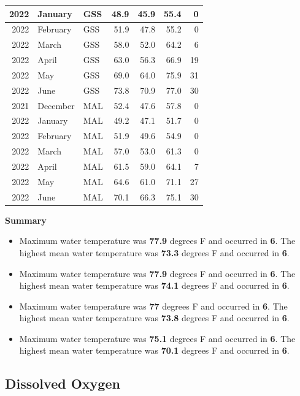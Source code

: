 \documentclass[
]{book}
\providecommand{\tightlist}{%
  \setlength{\itemsep}{0pt}\setlength{\parskip}{0pt}}
\theoremstyle{definition}
\theoremstyle{definition}
\theoremstyle{definition}
\theoremstyle{definition}
\theoremstyle{remark}
\begin{document}
\begin{table}
\begin{tabular}[t]{rllrrrr}
\hline
2022 & January & GSS & 48.9 & 45.9 & 55.4 & 0\\
\hline
2022 & February & GSS & 51.9 & 47.8 & 55.2 & 0\\
\hline
2022 & March & GSS & 58.0 & 52.0 & 64.2 & 6\\
\hline
2022 & April & GSS & 63.0 & 56.3 & 66.9 & 19\\
\hline
2022 & May & GSS & 69.0 & 64.0 & 75.9 & 31\\
\hline
2022 & June & GSS & 73.8 & 70.9 & 77.0 & 30\\
\hline
2021 & December & MAL & 52.4 & 47.6 & 57.8 & 0\\
\hline
2022 & January & MAL & 49.2 & 47.1 & 51.7 & 0\\
\hline
2022 & February & MAL & 51.9 & 49.6 & 54.9 & 0\\
\hline
2022 & March & MAL & 57.0 & 53.0 & 61.3 & 0\\
\hline
2022 & April & MAL & 61.5 & 59.0 & 64.1 & 7\\
\hline
2022 & May & MAL & 64.6 & 61.0 & 71.1 & 27\\
\hline
2022 & June & MAL & 70.1 & 66.3 & 75.1 & 30\\
\hline
\end{tabular}
\end{table}

\textbf{Summary}

\begin{itemize}
\tightlist
\item
  Maximum water temperature was \textbf{77.9} degrees F and occurred in \textbf{6}. The highest mean water temperature was \textbf{73.3} degrees F and occurred in \textbf{6}.
\item
  Maximum water temperature was \textbf{77.9} degrees F and occurred in \textbf{6}. The highest mean water temperature was \textbf{74.1} degrees F and occurred in \textbf{6}.
\item
  Maximum water temperature was \textbf{77} degrees F and occurred in \textbf{6}. The highest mean water temperature was \textbf{73.8} degrees F and occurred in \textbf{6}.
\item
  Maximum water temperature was \textbf{75.1} degrees F and occurred in \textbf{6}. The highest mean water temperature was \textbf{70.1} degrees F and occurred in \textbf{6}.
\end{itemize}

\hypertarget{dissolved-oxygen-2}{%
\subsection{Dissolved Oxygen}\label{dissolved-oxygen-2}}
\end{document}
